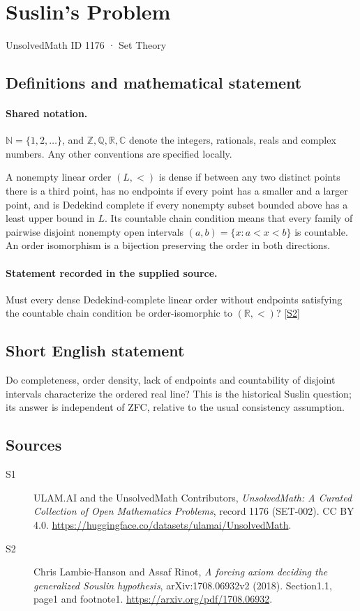 \documentclass[11pt]{book}
\newcommand{\sref}[2]{\hyperlink{source:#1:#2}{[S#2]}}
\begin{document}
\setcounter{section}{1175}
\section{Suslin's Problem}\label{1176}
{\small\sffamily UnsolvedMath ID 1176 · Set Theory}
\subsection{Definitions and mathematical statement}

\paragraph{Shared notation.}$\mathbb N=\{1,2,\ldots\}$, and $\mathbb Z,\mathbb Q,\mathbb R,\mathbb C$ denote the integers, rationals, reals and complex numbers. Any other conventions are specified locally.


A nonempty linear order $(L,<)$ is dense if between any two distinct points there is a third point, has no endpoints if every point has a smaller and a larger point, and is Dedekind complete if every nonempty subset bounded above has a least upper bound in $L$. Its countable chain condition means that every family of pairwise disjoint nonempty open intervals $(a,b)=\{x:a<x<b\}$ is countable. An order isomorphism is a bijection preserving the order in both directions.
\paragraph{Statement recorded in the supplied source.}
Must every dense Dedekind-complete linear order without endpoints satisfying the countable chain condition be order-isomorphic to $(\mathbb R,<)$? \sref{1176}{2}
\subsection{Short English statement}
Do completeness, order density, lack of endpoints and countability of disjoint intervals characterize the ordered real line? This is the historical Suslin question; its answer is independent of ZFC, relative to the usual consistency assumption.
\subsection{Sources}
\begin{description}
\item[\hypertarget{source:1176:1}{S1}] ULAM.AI and the UnsolvedMath Contributors, \emph{UnsolvedMath: A Curated Collection of Open Mathematics Problems}, record 1176 (SET-002). CC BY 4.0. \url{https://huggingface.co/datasets/ulamai/UnsolvedMath}.
\item[\hypertarget{source:1176:2}{S2}] Chris Lambie-Hanson and Assaf Rinot, \emph{A forcing axiom deciding the generalized Souslin hypothesis}, arXiv:1708.06932v2 (2018). Section1.1, page1 and footnote1. \url{https://arxiv.org/pdf/1708.06932}.
\end{description}
\label{end:1176}
\end{document}
